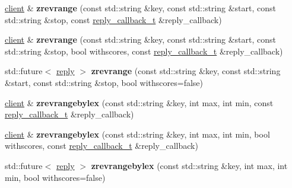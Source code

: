 \begin{DoxyCompactItemize}
\mbox{\hyperlink{classcpp__redis_1_1client}{client}} \& {\bfseries zrevrange} (const std\+::string \&key, const std\+::string \&start, const std\+::string \&stop, const \mbox{\hyperlink{classcpp__redis_1_1client_af7a65eb21aa25230bfbb0b0203c4fc04}{reply\+\_\+callback\+\_\+t}} \&reply\+\_\+callback)
\item 
\mbox{\label{classcpp__redis_1_1client_ae4cef5e8cba4196287bf89375889a2e4}} 
\mbox{\hyperlink{classcpp__redis_1_1client}{client}} \& {\bfseries zrevrange} (const std\+::string \&key, const std\+::string \&start, const std\+::string \&stop, bool withscores, const \mbox{\hyperlink{classcpp__redis_1_1client_af7a65eb21aa25230bfbb0b0203c4fc04}{reply\+\_\+callback\+\_\+t}} \&reply\+\_\+callback)
\item 
\mbox{\label{classcpp__redis_1_1client_a973fb4632a18f70bec092f3c9659045e}} 
std\+::future$<$ \mbox{\hyperlink{classcpp__redis_1_1reply}{reply}} $>$ {\bfseries zrevrange} (const std\+::string \&key, const std\+::string \&start, const std\+::string \&stop, bool withscores=false)
\item 
\mbox{\label{classcpp__redis_1_1client_aea70289a3a7652010371d572572f1129}} 
\mbox{\hyperlink{classcpp__redis_1_1client}{client}} \& {\bfseries zrevrangebylex} (const std\+::string \&key, int max, int min, const \mbox{\hyperlink{classcpp__redis_1_1client_af7a65eb21aa25230bfbb0b0203c4fc04}{reply\+\_\+callback\+\_\+t}} \&reply\+\_\+callback)
\item 
\mbox{\label{classcpp__redis_1_1client_ac4bc45fdb5e11691c6c0539d769900b5}} 
\mbox{\hyperlink{classcpp__redis_1_1client}{client}} \& {\bfseries zrevrangebylex} (const std\+::string \&key, int max, int min, bool withscores, const \mbox{\hyperlink{classcpp__redis_1_1client_af7a65eb21aa25230bfbb0b0203c4fc04}{reply\+\_\+callback\+\_\+t}} \&reply\+\_\+callback)
\item 
\mbox{\label{classcpp__redis_1_1client_a862509776d178c4efcc6567be70d261d}} 
std\+::future$<$ \mbox{\hyperlink{classcpp__redis_1_1reply}{reply}} $>$ {\bfseries zrevrangebylex} (const std\+::string \&key, int max, int min, bool withscores=false)
\item 
\mbox{\label{classcpp__redis_1_1client_afe98878a7d95157b859baeafe69bc539}} 

\end{DoxyCompactItemize}
